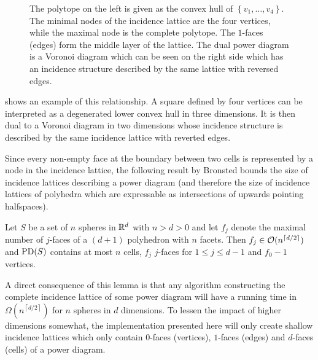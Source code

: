 \begin{figure}[tb]
    \caption{The polytope on the left is given as the convex hull of $\left\{ v_1, \dots, v_4 \right\}$.
    The minimal nodes of the incidence lattice are the four vertices, while the maximal node is the complete polytope. The $1$-faces (edges) form the middle layer of the lattice.
    The dual power diagram is a Voronoi diagram which can be seen on the right side which has an incidence structure described by the same lattice with reversed edges.}
    \label{fig:incidencelattice}
\end{figure}
 shows an example of this relationship.
A square defined by four vertices can be interpreted as a degenerated lower convex hull in three dimensions. It is then dual to a Voronoi diagram in two dimensions whose incidence structure is described by the same incidence lattice with reverted edges.

Since every non-empty face at the boundary between two cells is represented by a node in the incidence lattice, the following result by Bronsted \cite{brondsted2012introduction} bounds the size of incidence lattices describing a power diagram (and therefore the size of incidence lattices of polyhedra which are expressable as intersections of upwards pointing halfspaces).

\begin{lemma}
    \label{lem:latticesexponential}
    Let $S$ be a set of $n$ spheres in $\mathbb{R}^d$ with $n > d > 0$ and let $f_j$ denote the maximal number of $j$-faces of a $(d + 1)$ polyhedron with $n$ facets. Then $f_j \in \mathcal{O}(n^{\left\lceil d/2 \right\rceil})$ and $\operatorname{PD}(S)$ contains at most $n$ cells, $f_j$ $j$-faces for $1 \leq j \leq d-1$ and $f_0 - 1$ vertices.
\end{lemma}

A direct consequence of this lemma is that any algorithm constructing the complete incidence lattice of some power diagram will have a running time in $\Omega(n^{\left\lceil d/2 \right\rceil})$ for $n$ spheres in $d$ dimensions.
To lessen the impact of higher dimensions somewhat, the implementation presented here will only create shallow incidence lattices which only contain $0$-faces (vertices), $1$-faces (edges) and $d$-faces (cells) of a power diagram.

